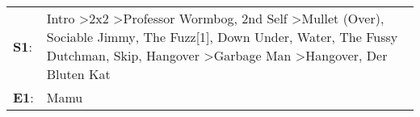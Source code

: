 \begin{supertabular}{p{0.03\textwidth}p{0.92\textwidth}}
 \textbf{S1}:  &  Intro\textsuperscript{} \textgreater \enspace 2x2\textsuperscript{} \textgreater \enspace Professor Wormbog\textsuperscript{}, \enspace 2nd Self\textsuperscript{} \textgreater \enspace Mullet (Over)\textsuperscript{}, \enspace Sociable Jimmy\textsuperscript{}, \enspace The Fuzz[1]\textsuperscript{}, \enspace Down Under\textsuperscript{}, \enspace Water\textsuperscript{}, \enspace The Fussy Dutchman\textsuperscript{}, \enspace Skip\textsuperscript{}, \enspace Hangover\textsuperscript{} \textgreater \enspace Garbage Man\textsuperscript{} \textgreater \enspace Hangover\textsuperscript{}, \enspace Der Bluten Kat\textsuperscript{}  \enspace  \\
 \textbf{E1}:  &                                                                                                                                                                                                                                                                                                                                                                                                                                                                                                                                                                                                                                     Mamu\textsuperscript{}  \enspace  \\
\end{supertabular}
